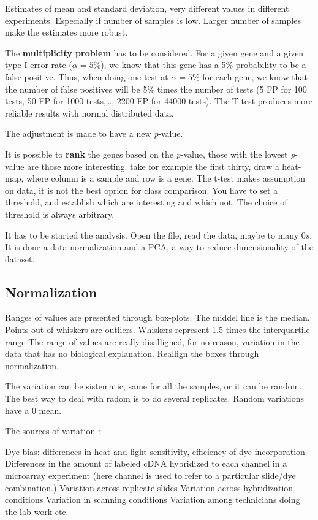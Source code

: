 Estimates of mean and standard deviation, very different values in different experiments. Especially if number of samples is low. Larger number of samples make the estimates more robust.

The \textbf{multiplicity problem} has to be considered.
For a given gene and a given type I error rate ($ \alpha=5\% $), we know that this gene has a
5\% probability to be a false positive. Thus, when doing one test at $\alpha=5\%$  for each
gene, we know that the number of false positives will be 5\% times the number of
tests (5 FP for 100 tests, 50 FP for 1000 tests,…, 2200 FP for 44000 tests).
The T-test produces more reliable results with normal distributed data.


The adjustment is made to have a new \textit{p}-value.

It is possible to \textbf{rank} the genes based on the \textit{p}-value, those with the lowest \textit{p}-value are those more interesting. take for example the first thirty, draw a heat-map, where column is a sample and row is a gene. The t-test makes assumption on data, it is not the best oprion for class comparison. You have to set a threshold, and establish which are interesting and which not. The choice of threshold is always arbitrary. 

It has to be started the analysis. Open the file, read the data, maybe to many $ 0s $. It is done a data normalization and a PCA, a way to reduce dimensionality of the dataset. 

\subsection{Normalization}
Ranges of values are presented through box-plots. The middel line is the median. Points out of whiskers are outliers. Whiskers represent 1.5 times the interquartile range %
The range of values are really disalligned, for no reason, variation in the data that has no biological explanation. Reallign the boxes through normalization.

The variation can be sistematic, same for all the samples, or it can be random. The best way to deal with radom is to do several replicates. Random variations have a 0 mean. 

The sources of variation :

Dye bias: differences in heat and light sensitivity, efficiency of
dye incorporation
Differences in the amount of labeled cDNA hybridized to each
channel in a microarray experiment (here channel is used to
refer to a particular slide/dye combination.)
Variation across replicate slides
Variation across hybridization conditions
Variation in scanning conditions
Variation among technicians doing the lab work
etc.

